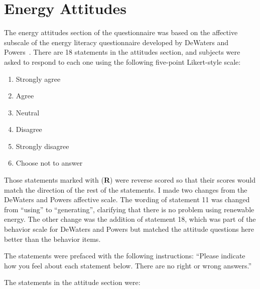 \section{Energy Attitudes}
\label{sec:attitude-items}

The energy attitudes section of the questionnaire was based on the affective subscale of the energy literacy questionnaire developed by DeWaters and Powers~\cite{DeWaters2011}. There are 18 statements in the attitudes section, and subjects were asked to respond to each one using the following five-point Likert-style scale:

\begin{enumerate}
	\item Strongly agree
	\item Agree
	\item Neutral
	\item Disagree
	\item Strongly disagree
	\item Choose not to answer
\end{enumerate}

Those statements marked with (\textbf{R}) were reverse scored so that their scores would match the direction of the rest of the statements. I made two changes from the DeWaters and Powers affective scale. The wording of statement 11 was changed from ``using'' to ``generating'', clarifying that there is no problem using renewable energy. The other change was the addition of statement 18, which was part of the behavior scale for DeWaters and Powers but matched the attitude questions here better than the behavior items.

The statements were prefaced with the following instructions: ``Please indicate how you feel about each statement below. There are no right or wrong answers.''

The statements in the attitude section were:

